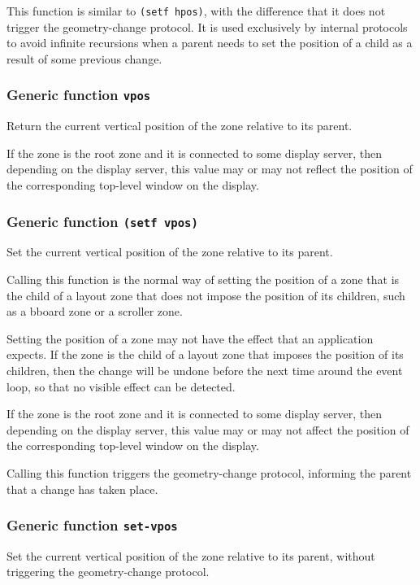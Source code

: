 \documentclass{report}
\begin{document}
This function is similar to \texttt{(setf hpos)}, with the difference
that it does not trigger the geometry-change protocol.  It is used
exclusively by internal protocols to avoid infinite recursions when a
parent needs to set the position of a child as a result of some
previous change.

\subsubsection{Generic function \texttt{vpos}}

Return the current vertical position of the zone relative to its
parent.  

If the zone is the root zone and it is connected to some display
server, then depending on the display server, this value may or
may not reflect the position of the corresponding top-level window
on the display.

\subsubsection{Generic function \texttt{(setf vpos)}}

Set the current vertical position of the zone relative to its
parent.

Calling this function is the normal way of setting the position of
a zone that is the child of a layout zone that does not impose the
position of its children, such as a bboard zone or a scroller
zone.

Setting the position of a zone may not have the effect that an
application expects.  If the zone is the child of a layout zone
that imposes the position of its children, then the change will be
undone before the next time around the event loop, so that no
visible effect can be detected.  

If the zone is the root zone and it is connected to some display
server, then depending on the display server, this value may or
may not affect the position of the corresponding top-level window
on the display.

Calling this function triggers the geometry-change protocol,
informing the parent that a change has taken place.  

\subsubsection{Generic function \texttt{set-vpos}}

Set the current vertical position of the zone relative to its
parent, without triggering the geometry-change protocol.
\end{document}
